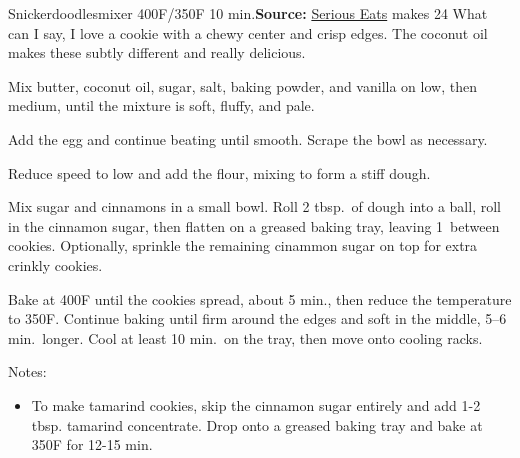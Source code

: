 \begin{recipe}{Snickerdoodles}{mixer \hfill 400\0F/350\0F \hfill 10 min.}{\textbf{Source:} \href{https://www.seriouseats.com/recipes/2016/01/new-fashioned-snickerdoodle-cookie-recipe.html}{Serious Eats} \hfill makes 24}
 \freeform What can I say, I love a cookie with a chewy center and crisp edges. The coconut oil makes these subtly different and really delicious.

 Mix butter, coconut oil, sugar, salt, baking powder, and vanilla on low, then medium, until the mixture is soft, fluffy, and pale.

 Add the egg and continue beating until smooth. Scrape the bowl as necessary.

 Reduce speed to low and add the flour, mixing to form a stiff dough.

 Mix sugar and cinnamons in a small bowl. Roll 2 tbsp.\ of dough into a ball, roll in the cinnamon sugar, then flatten on a greased baking tray, leaving 1\inch\ between cookies. Optionally, sprinkle the remaining cinammon sugar on top for extra crinkly cookies.

 \newstep Bake at 400\0F until the cookies spread, about 5 min., then reduce the temperature to 350\0F. Continue baking until firm around the edges and soft in the middle, 5--6 min.\ longer. Cool at least 10 min.\ on the tray, then move onto cooling racks.

 \freeform Notes:
\begin{itemize}
  \item To make tamarind cookies, skip the cinnamon sugar entirely and add 1-2 tbsp. tamarind concentrate. Drop onto a greased baking tray and bake at 350\0F for 12-15 min.
\end{itemize}
\end{recipe}
